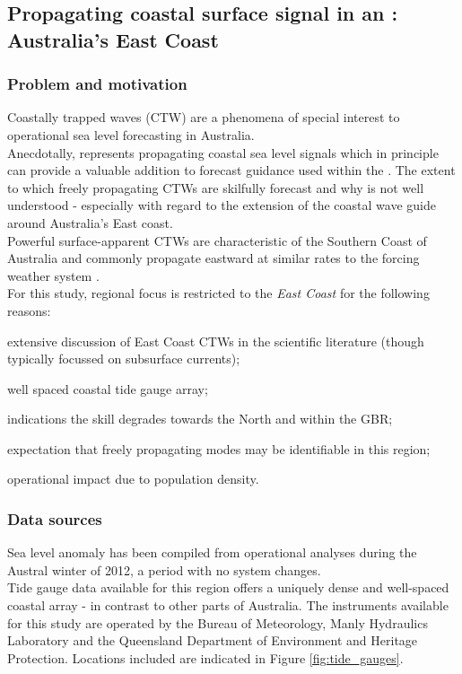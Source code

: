 \newpage
\subsection{Propagating coastal surface signal in an \OGCM{}: Australia's East Coast}
\label{S:plan_CTW}

\subsubsection{Problem and motivation}
Coastally trapped waves (CTW) are a phenomena of special interest to operational sea level forecasting in Australia. \\
Anecdotally, \BL{} represents propagating coastal sea level signals which in principle can provide a valuable addition to forecast guidance used within the \BOM.  The extent to which freely propagating CTWs are skilfully forecast and why is not well understood - especially with regard to the extension of the coastal wave guide around Australia's East coast.\\



Powerful surface-apparent CTWs are characteristic of the Southern Coast of Australia and commonly propagate eastward at similar rates to the forcing weather system \citep{Taylor:2009vw}.\\
For this study, regional focus is restricted to the \emph{East Coast} for the following reasons:
\begin{inparaenum}[(a)]
\item extensive discussion of East Coast CTWs in the scientific literature (though typically focussed on subsurface currents);
\item well spaced coastal tide gauge array;
\item indications the \BL{} skill degrades towards the North and within the GBR;  
\item expectation that freely propagating modes may be identifiable in this region;
\item operational impact due to population density.
\end{inparaenum}


\subsubsection{Data sources}
Sea level anomaly has been compiled from operational \BL{} analyses during the Austral winter of 2012, a period with no system changes.\\  
Tide gauge data available for this region offers a uniquely dense and well-spaced coastal array - in contrast to other parts of Australia.   The instruments available for this study are operated by the Bureau of Meteorology, Manly Hydraulics Laboratory and the Queensland Department of Environment and Heritage Protection.  Locations included are indicated in Figure \ref{fig:tide_gauges}.\\

